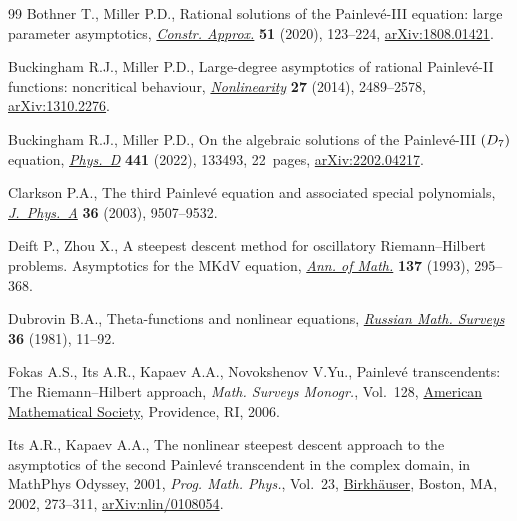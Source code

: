 \documentclass[11pt]{article}
\numberwithin{equation}{section}
\numberwithin{equation}{section}
\begin{document}
\begin{thebibliography}{99}
Bothner T., Miller P.D., Rational solutions of the {P}ainlev\'e-{III} equation:
 large parameter asymptotics, \href{https://doi.org/10.1007/s00365-019-09463-4}{\textit{Constr. Approx.}} \textbf{51} (2020),
 123--224, \href{https://arxiv.org/abs/1808.01421}{arXiv:1808.01421}.

Buckingham R.J., Miller P.D., Large-degree asymptotics of rational
 {P}ainlev\'e-{II} functions: noncritical behaviour, \href{https://doi.org/10.1088/0951-7715/27/10/2489}{\textit{Nonlinearity}}
 \textbf{27} (2014), 2489--2578, \href{https://arxiv.org/abs/1310.2276}{arXiv:1310.2276}.

Buckingham R.J., Miller P.D., On the algebraic solutions of the
 {P}ainlev\'e-{III} {$(\rm D_7)$} equation, \href{https://doi.org/10.1016/j.physd.2022.133493}{\textit{Phys.~D}} \textbf{441}
 (2022), 133493, 22~pages, \href{https://arxiv.org/abs/2202.04217}{arXiv:2202.04217}.

Clarkson P.A., The third {P}ainlev\'e equation and associated special
 polynomials, \href{https://doi.org/10.1088/0305-4470/36/36/306}{\textit{J.~Phys.~A}} \textbf{36} (2003), 9507--9532.

Deift P., Zhou X., A steepest descent method for oscillatory
 {R}iemann--{H}ilbert problems. {A}symptotics for the {MK}d{V} equation,
 \href{https://doi.org/10.2307/2946540}{\textit{Ann. of Math.}} \textbf{137} (1993), 295--368.

Dubrovin B.A., Theta-functions and nonlinear equations, \href{https://doi.org/10.1070/RM1981v036n02ABEH002596}{\textit{Russian Math.
 Surveys}} \textbf{36} (1981), 11--92.

Fokas A.S., Its A.R., Kapaev A.A., Novokshenov V.Yu., Painlev\'e transcendents:
 {T}he {R}iemann--{H}ilbert approach, \textit{Math. Surveys Monogr.}, Vol.~128, \href{https://doi.org/10.1090/surv/128}{American Mathematical Society}, Providence, RI, 2006.

Its A.R., Kapaev A.A., The nonlinear steepest descent approach to the
 asymptotics of the second {P}ainlev\'e transcendent in the complex domain, in
 Math{P}hys Odyssey, 2001, \textit{Prog. Math. Phys.}, Vol.~23, \href{https://doi.org/10.1007/978-1-4612-0087-1_10}{Birkh\"auser},
 Boston, MA, 2002, 273--311, \href{https://arxiv.org/abs/nlin/0108054}{arXiv:nlin/0108054}.


\end{thebibliography}
\end{document}
